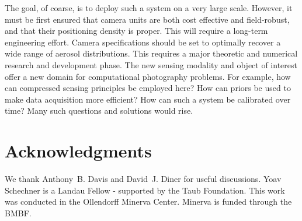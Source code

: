 \documentclass[10pt,letterpaper]{article}
\begin{document}
The goal, of coarse, is to deploy such a system on a very large
scale. However, it must be first ensured that camera units are both
cost effective and field-robust, and that their positioning density is
proper. This will require a long-term engineering effort. Camera
specifications should be set to optimally recover a wide range of
aerosol distributions. This requires a major theoretic and numerical
research and development phase.  The new sensing modality and object
of interest offer a new domain for computational photography
problems. For example, how can compressed sensing principles be
employed here? How can priors be used to make data acquisition more
efficient? How can such a system be calibrated over time? Many such
questions and solutions would rise.


\section*{Acknowledgments}
\label{sec:acknowledgments}

We thank Anthony~B. Davis and David~J. Diner for useful
discussions. Yoav Schechner is a Landau Fellow - supported by the Taub
Foundation. This work was conducted in the Ollendorff Minerva
Center. Minerva is funded through the BMBF.
\end{document}

